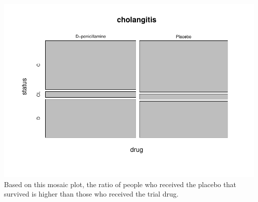 \documentclass[
]{article}
\begin{document}
\includegraphics{final_proj_files/figure-latex/unnamed-chunk-2-1.pdf}
Based on this mosaic plot, the ratio of people who received the placebo
that survived is higher than those who received the trial drug.
\end{document}
